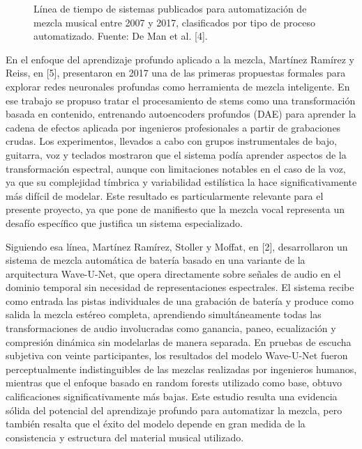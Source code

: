 \documentclass[12pt]{article}
\begin{document}
\begin{figure}[h!]
\centering
\caption{Línea de tiempo de sistemas publicados para automatización de mezcla musical entre 2007 y 2017, clasificados por tipo de proceso automatizado. Fuente: De Man et al. [4].}
\label{fig:fig7}
\end{figure}

En el enfoque del aprendizaje profundo aplicado a la mezcla, Martínez Ramírez y Reiss, en [5], presentaron en 2017 una de las primeras propuestas formales para explorar redes neuronales profundas como herramienta de mezcla inteligente. En ese trabajo se propuso tratar el procesamiento de stems como una transformación basada en contenido, entrenando autoencoders profundos (DAE) para aprender la cadena de efectos aplicada por ingenieros profesionales a partir de grabaciones crudas. Los experimentos, llevados a cabo con grupos instrumentales de bajo, guitarra, voz y teclados mostraron que el sistema podía aprender aspectos de la transformación espectral, aunque con limitaciones notables en el caso de la voz, ya que su complejidad tímbrica y variabilidad estilística la hace significativamente más difícil de modelar. Este resultado es particularmente relevante para el presente proyecto, ya que pone de manifiesto que la mezcla vocal representa un desafío específico que justifica un sistema especializado.

Siguiendo esa línea, Martínez Ramírez, Stoller y Moffat, en [2], desarrollaron un sistema de mezcla automática de batería basado en una variante de la arquitectura Wave-U-Net, que opera directamente sobre señales de audio en el dominio temporal sin necesidad de representaciones espectrales. El sistema recibe como entrada las pistas individuales de una grabación de batería y produce como salida la mezcla estéreo completa, aprendiendo simultáneamente todas las transformaciones de audio involucradas como ganancia, paneo, ecualización y compresión dinámica sin modelarlas de manera separada. En pruebas de escucha subjetiva con veinte participantes, los resultados del modelo Wave-U-Net fueron perceptualmente indistinguibles de las mezclas realizadas por ingenieros humanos, mientras que el enfoque basado en random forests utilizado como base, obtuvo calificaciones significativamente más bajas. Este estudio resulta una evidencia sólida del potencial del aprendizaje profundo para automatizar la mezcla, pero también resalta que el éxito del modelo depende en gran medida de la consistencia y estructura del material musical utilizado.
\end{document}
